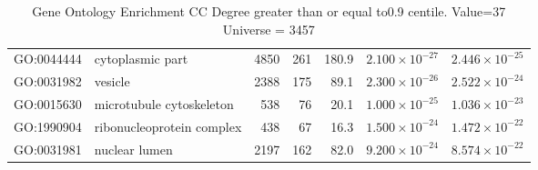 \begin{table}[ht]
\begin{adjustbox}{max width=\textwidth}
\begin{tabular}{llrrrrr}
  GO:0044444 & cytoplasmic part & 4850 & 261 & 180.9 & $2.100 \times 10^{-27}$ & $2.446 \times 10^{-25}$ \\ 
  GO:0031982 & vesicle & 2388 & 175 & 89.1 & $2.300 \times 10^{-26}$ & $2.522 \times 10^{-24}$ \\ 
  GO:0015630 & microtubule cytoskeleton & 538 & 76 & 20.1 & $1.000 \times 10^{-25}$ & $1.036 \times 10^{-23}$ \\ 
  GO:1990904 & ribonucleoprotein complex & 438 & 67 & 16.3 & $1.500 \times 10^{-24}$ & $1.472 \times 10^{-22}$ \\ 
  GO:0031981 & nuclear lumen & 2197 & 162 & 82.0 & $9.200 \times 10^{-24}$ & $8.574 \times 10^{-22}$ \\ 
   \hline
\end{tabular}
\end{adjustbox}
\caption{Gene Ontology Enrichment CC Degree  greater than or equal to0.9 centile.   Value=37 Universe = 3457} 
\label{tab:Gene Ontology Enrichment CC Degree  greater than or equal to0.9 centile.   Value=37 Universe = 3457}
\end{table}


